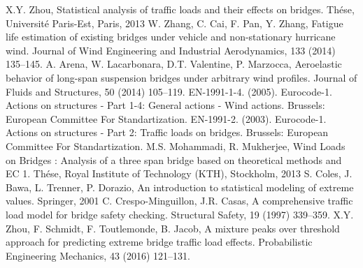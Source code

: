 \documentclass[11pt,a4paper]{article}
\begin{document}

\begin{thebibliography}{9}
\bigskip
	X.Y. Zhou,
	Statistical analysis of traffic loads and their effects on bridges. 
	Th\'ese,
	Universit\'e Paris-Est,
	Paris,
	2013
	W. Zhang, C. Cai, F. Pan, Y. Zhang,
	Fatigue life estimation of existing bridges under vehicle and non-stationary hurricane wind. 
	Journal of Wind Engineering and Industrial Aerodynamics,
	133 (2014) 135--145.
	A. Arena, W. Lacarbonara, D.T. Valentine, P. Marzocca,
	Aeroelastic behavior of long-span suspension bridges under arbitrary wind profiles.
	Journal of Fluids and Structures,
	50 (2014) 105--119.
	EN-1991-1-4. (2005). Eurocode-1. Actions on structures - Part 1-4: General actions - Wind actions.
	Brussels: European Committee For Standartization.
	EN-1991-2. (2003). Eurocode-1. Actions on structures - Part 2: Traffic loads on bridges. 
	Brussels: European Committee For Standartization.
	M.S. Mohammadi, R. Mukherjee,
	Wind Loads on Bridges : Analysis of a three span bridge based on theoretical methods and EC 1.
	Th\'ese,
	Royal Institute of Technology (KTH),
	Stockholm, 	
	2013
	S. Coles, J. Bawa, L. Trenner, P. Dorazio,
	An introduction to statistical modeling of extreme values. 
	Springer,
	2001	
	C. Crespo-Minguillon, J.R. Casas,
	A comprehensive traffic load model for bridge safety checking. 
	Structural Safety,
	19 (1997) 339--359.
	X.Y. Zhou, F. Schmidt, F. Toutlemonde, B. Jacob,
	A mixture peaks over threshold approach for predicting extreme bridge traffic load effects. 	
	Probabilistic Engineering Mechanics, 
	43 (2016) 121--131.
\end{thebibliography}

%
\end{document}

